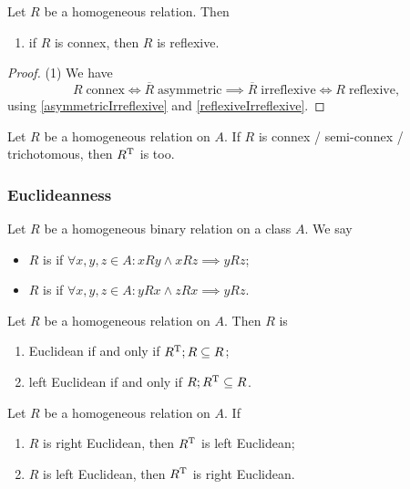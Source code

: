 \begin{corollary} \label{connexityConsequences}
Let $R$ be a homogeneous relation. Then
\begin{enumerate}
\item if $R$ is connex, then $R$ is reflexive.
\end{enumerate}
\end{corollary}
\begin{proof}
(1) We have
\[ R \; \text{connex} \iff \overline{R} \; \text{asymmetric} \implies \overline{R} \; \text{irreflexive} \iff R \; \text{reflexive}, \]
using \ref{asymmetricIrreflexive} and \ref{reflexiveIrreflexive}. 
\end{proof}

\begin{lemma}
Let $R$ be a homogeneous relation on $A$. If $R$ is connex / semi-connex / trichotomous, then $R^{\mathrm{T}}$ is too.
\end{lemma}

\subsubsection{Euclideanness}
\begin{definition}
Let $R$ be a homogeneous binary relation on a class $A$. We say
\begin{itemize}
\item $R$ is  if $\forall x,y,z\in A: xRy \land xRz \implies yRz$;
\item $R$ is  if $\forall x,y,z\in A: yRx \land zRx \implies yRz$.
\end{itemize}
\end{definition}

\begin{lemma}
Let $R$ be a homogeneous relation on $A$. Then $R$ is
\begin{enumerate}
\item Euclidean \textup{if and only if} $R^{\mathrm{T}}; R \subseteq R$;
\item left Euclidean \textup{if and only if} $R; R^{\mathrm{T}} \subseteq R$.
\end{enumerate}
\end{lemma}
\begin{lemma}
Let $R$ be a homogeneous relation on $A$. If
\begin{enumerate}
\item $R$ is right Euclidean, then $R^{\mathrm{T}}$ is left Euclidean;
\item $R$ is left Euclidean, then $R^{\mathrm{T}}$ is right Euclidean.
\end{enumerate}
\end{lemma}

